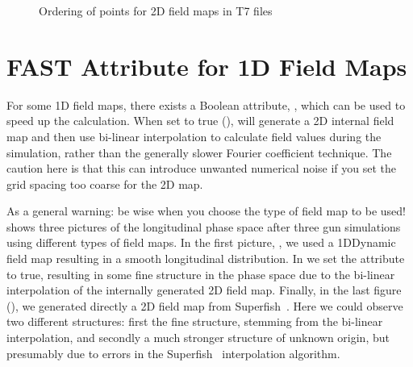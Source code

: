 \begin{figure}[tb]
\centering
{}
\hspace{0.05\textwidth}
\caption[]{Ordering of points for 2D field maps in  T7 files}
\label{fig:fieldmap_ordering}
\end{figure}

\section{FAST Attribute for 1D Field Maps}
\label{sec:fastattribute}
For some 1D field maps, there exists a Boolean attribute, , which can be used to speed up the calculation. When set to true
(), \opalt will generate a 2D internal field map and then use bi-linear interpolation to calculate field values
during the simulation, rather than the generally slower Fourier coefficient technique. The caution here is that this can introduce
unwanted numerical noise if you set the grid spacing too coarse for the 2D map.

\leftpointright As a general warning: be wise when you choose the type of field map to be used!  shows
three pictures of the longitudinal phase space after three gun simulations using different types of field maps. In the first picture,
, we used a 1DDynamic field map  resulting in a smooth longitudinal
distribution. In  we set the  attribute to true, resulting in some fine structure
in the phase space due to the bi-linear interpolation of the internally generated 2D field map. Finally, in the last figure
(), we generated directly a 2D field map from  Superfish~\cite{superfish}. Here we could
observe two different structures: first the fine structure, stemming from the bi-linear interpolation, and secondly a much stronger
structure of unknown origin, but presumably due to errors in the Superfish~\cite{superfish} interpolation algorithm.

